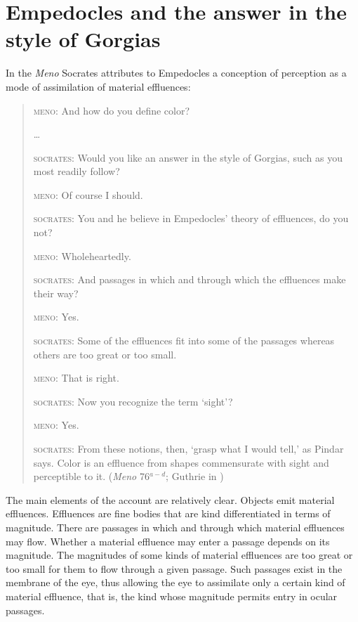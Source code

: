 \documentclass[12pt]{article}
\begin{document}

\section{Empedocles and the answer in the style of Gorgias} %
\label{sec:empedocles_and_the_answer_in_the_style_of_gorgias}

In the \emph{Meno} Socrates attributes to Empedocles a conception of perception as a mode of assimilation of material effluences:
\begin{quotation}
    \textsc{meno}: And how do you define color?
    
    \ldots
    
    \textsc{socrates}: Would you like an answer in the style of Gorgias, such as you most readily follow?
    
    \textsc{meno}: Of course I should.
    
    \textsc{socrates}: You and he believe in Empedocles' theory of effluences, do you not?
    
    \textsc{meno}: Wholeheartedly.
    
    \textsc{socrates}: And passages in which and through which the effluences make their way?
    
    \textsc{meno}: Yes.
    
    \textsc{socrates}: Some of the effluences fit into some of the passages whereas others are too great or too small.
    
    \textsc{meno}: That is right.
    
    \textsc{socrates}: Now you recognize the term `sight'?
    
    \textsc{meno}: Yes.
    
    \textsc{socrates}: From these notions, then, `grasp what I would tell,' as Pindar says. Color is an effluence from shapes commensurate with sight and perceptible to it. (\emph{Meno} 76\( ^{a-d} \); Guthrie in \citealt[359]{Hamilton:1989fk})
\end{quotation}

The main elements of the account are relatively clear. Objects emit material effluences. Effluences are fine bodies that are kind differentiated in terms of magnitude. There are passages in which and through which material effluences may flow. Whether a material effluence may enter a passage depends on its magnitude. The magnitudes of some kinds of material effluences are too great or too small for them to flow through a given passage. Such passages exist in the membrane of the eye, thus allowing the eye to assimilate only a certain kind of material effluence, that is, the kind whose magnitude permits entry in ocular passages.
\end{document}

